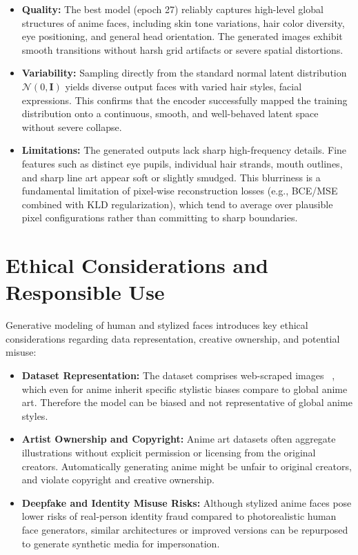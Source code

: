 \documentclass[stu, 12pt, floatsintext]{apa7}
\begin{document}
\begin{itemize}
	\item \textbf{Quality:} The best model (epoch 27) reliably captures high-level global structures of anime faces, including skin tone variations, hair color diversity, eye positioning, and general head orientation. The generated images exhibit smooth transitions without harsh grid artifacts or severe spatial distortions.
	\item \textbf{Variability:} Sampling directly from the standard normal latent distribution $\mathcal{N}(0, \mathbf{I})$ yields diverse output faces with varied hair styles, facial expressions. This confirms that the encoder successfully mapped the training distribution onto a continuous, smooth, and well-behaved latent space without severe collapse.
	\item \textbf{Limitations:}  The generated outputs lack sharp high-frequency details. Fine features such as distinct eye pupils, individual hair strands, mouth outlines, and sharp line art appear soft or slightly smudged. This blurriness is a fundamental limitation of pixel-wise reconstruction losses (e.g., BCE/MSE combined with $\text{KLD}$ regularization), which tend to average over plausible pixel configurations rather than committing to sharp boundaries.
\end{itemize}

\section{Ethical Considerations and Responsible Use}
Generative modeling of human and stylized faces introduces key ethical considerations regarding data representation, creative ownership, and potential misuse:

\begin{itemize}
	\item \textbf{Dataset Representation:} The dataset comprises web-scraped images ~\parencite{org-animefacedataset}, which even for anime inherit specific stylistic biases compare to global anime art. Therefore the  model can be biased and not representative of global anime styles.
	\item \textbf{Artist Ownership and Copyright:} Anime art datasets often aggregate illustrations without explicit permission or licensing from the original creators. Automatically generating anime might be unfair to original creators, and violate copyright and creative ownership.
	\item \textbf{Deepfake and Identity Misuse Risks:} Although stylized anime faces pose lower risks of real-person identity fraud compared to photorealistic human face generators, similar architectures or improved versions can be repurposed to generate synthetic media for impersonation.
\end{itemize}
\end{document}

